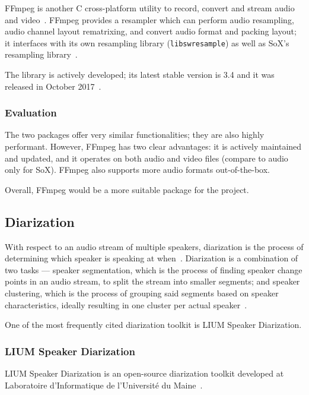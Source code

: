FFmpeg is another C cross-platform utility to record, convert and stream
audio and video~\cite{ffmpeg}. FFmpeg provides a resampler which can
perform audio resampling, audio channel layout rematrixing, and convert
audio format and packing layout; it interfaces with its own resampling
library (\texttt{libswresample}) as well as SoX's resampling
library~\cite{ffmpeg-res,ffmpeg-libres}.

The library is actively developed; its latest stable version is 3.4
and it was released in October 2017~\cite{ffmpeg-dl}.

\subsubsection{Evaluation}

The two packages offer very similar functionalities; they are also
highly performant. However, FFmpeg has two clear advantages: it is
actively maintained and updated, and it operates on both audio and
video files (compare to audio only for SoX). FFmpeg also supports
more audio formats out-of-the-box.

Overall, FFmpeg would be a more suitable package for the project.

\subsection{Diarization}

With respect to an audio stream of multiple speakers, diarization is
the process of determining which speaker is speaking at when~\cite{diar}. 
Diarization is a combination of two tasks --- speaker segmentation,
which is the process of finding speaker change points in an audio stream,
to split the stream into smaller segments; and speaker clustering,
which is the process of grouping said segments based on speaker
characteristics, ideally resulting in one cluster per actual
speaker~\cite{diar-cls}.

One of the most frequently cited diarization toolkit is LIUM Speaker
Diarization.

\subsubsection{LIUM Speaker Diarization}

LIUM Speaker Diarization is an open-source diarization toolkit developed
at Laboratoire d'Informatique de l'Université du Maine~\cite{lium}.



